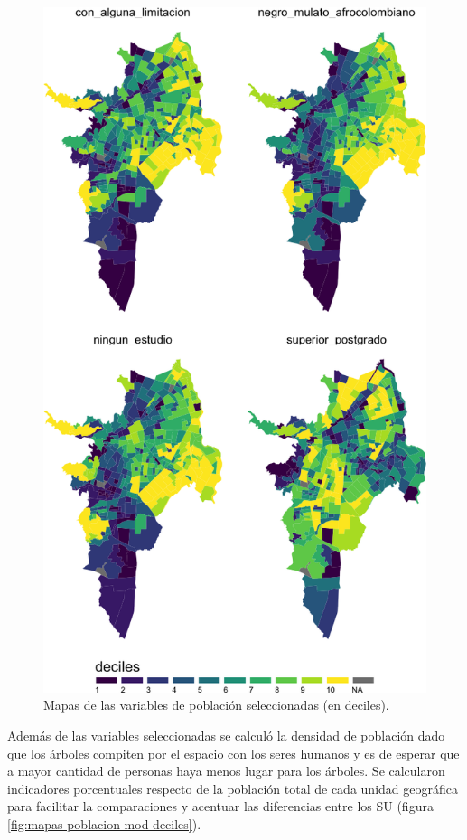 \documentclass[12pt,a4paper,openany]{book}
\theoremstyle{definition}
\theoremstyle{definition}
\theoremstyle{definition}
\theoremstyle{remark}
\begin{document}
\begin{figure}[p]

{\centering \includegraphics[width=0.7\linewidth]{tesis-unigis_files/figure-latex/mapas-poblacion-deciles-1} 

}

\caption{Mapas de las variables de población seleccionadas (en deciles).}\label{fig:mapas-poblacion-deciles}
\end{figure}

Además de las variables seleccionadas se calculó la densidad de
población dado que los árboles compiten por el espacio con los seres
humanos y es de esperar que a mayor cantidad de personas haya menos
lugar para los árboles. Se calcularon indicadores porcentuales respecto
de la población total de cada unidad geográfica para facilitar la
comparaciones y acentuar las diferencias entre los SU (figura
\ref{fig:mapas-poblacion-mod-deciles}).
\end{document}

